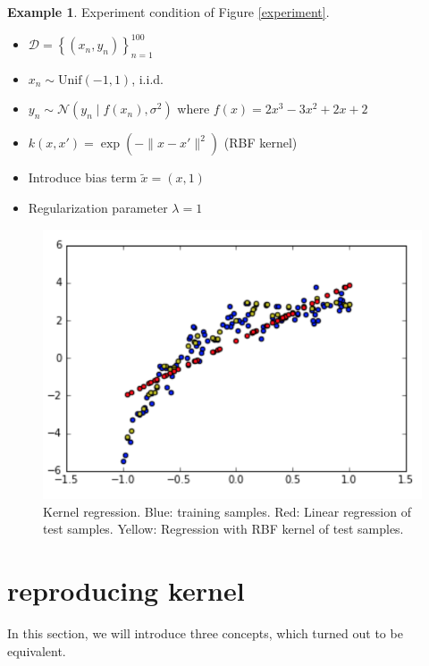 \documentclass{amsart}
\theoremstyle{definition}
\newtheorem{example}[theorem]{Example}
\theoremstyle{remark}
\numberwithin{equation}{section}
\newcommand{\blankbox}[2]{%
  \parbox{\columnwidth}{\centering
    \setlength{\fboxsep}{0pt}%
    \fbox{\raisebox{0pt}[#2]{\hspace{#1}}}%
  }%
}
\begin{document}
\begin{example}

Experiment condition of Figure \ref{experiment}.

\begin{itemize}
\item $\mathcal{D} = \left\{(x_n, y_n)\right\}_{n=1}^{100}$
\item $x_n \sim \mathrm{Unif}(-1, 1)$, i.i.d.
\item $y_n \sim \mathcal{N}(y_n \mid f(x_n), \sigma^{2})$ where $f(x) = 2 x^3 - 3 x^2 + 2x + 2$
\item $k(x, x') = \exp(-\|x-x'\|^2)$ (RBF kernel)
\item Introduce bias term $\tilde{x} = (x, 1)$
\item Regularization parameter $\lambda = 1$
\end{itemize}

\begin{figure}[tb]\label{experiment}
\includegraphics{kernel_regression.png}
\caption{Kernel regression. Blue: training samples. Red: Linear regression of test samples. Yellow: Regression with RBF kernel of test samples.}
\label{kernel_regression}
\end{figure}
\end{example}

\section{reproducing kernel}

In this section, we will introduce three concepts, which turned out to be equivalent.
\end{document}
